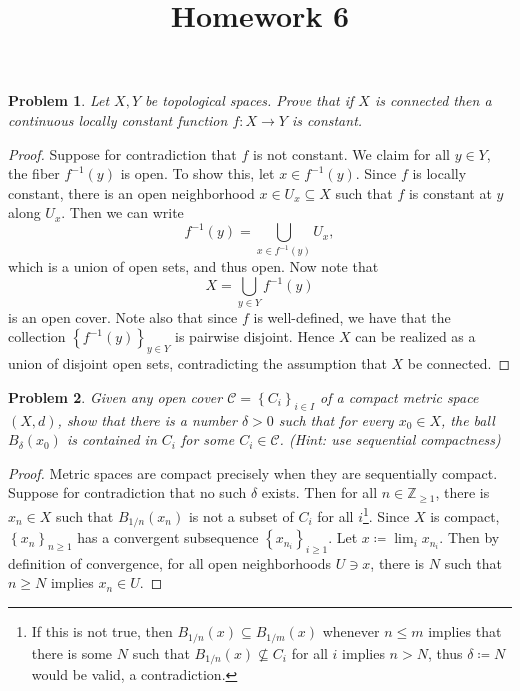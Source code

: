 \documentclass[11pt, letterpaper]{article}
\title{Homework 6}
\theoremstyle{plain}
\newtheorem{problem}{Problem}
\begin{document}
\makeproblem
\begin{problem}
	Let $X,Y$ be topological spaces. Prove that if $X$ is connected then a continuous locally constant function $f : X \to Y$ is constant.
\end{problem}
\begin{proof}
	Suppose for contradiction that $f$ is not constant. We claim for all $y\in Y$, the fiber $f^{-1} (y)$ is open. To show this, let $x\in f^{-1} (y)$. Since $f$ is locally constant, there is an open neighborhood $x\in U_x\subseteq X$ such that $f$ is constant at $y$ along $U_x$. Then we can write
	\[
		f^{-1} (y) = \bigcup_{x\in f^{-1} (y)} U_x,
	\]
	which is a union of open sets, and thus open. Now note that
	\[
		X=\bigcup_{y\in Y} f^{-1} (y)
	\]
	is an open cover. Note also that since $f$ is well-defined, we have that the collection $\left\{ f^{-1} (y) \right\} _{y\in Y} $ is pairwise disjoint. Hence $X$ can be realized as a union of disjoint open sets, contradicting the assumption that $X$ be connected.
\end{proof}
\begin{problem}
	Given any open cover $\mathcal{C} =\left\{ C_i \right\} _{i\in I} $ of a compact metric space $(X,d)$, show that there is a number $\delta >0$ such that for every $x_0\in X$, the ball $B_\delta (x_0)$ is contained in $C_i$ for some $C_i\in \mathcal{C} $. (Hint: use sequential compactness)
\end{problem}
\begin{proof}
	Metric spaces are compact precisely when they are sequentially compact. Suppose for contradiction that no such $\delta $ exists. Then for all $n\in\mathbb{Z} _{\geq 1} $, there is $x_n\in X$ such that $B_{1/n} (x_n)$ is not a subset of $C_i$ for all $i$\footnote{If this is not true, then $B_{1/n} (x)\subseteq B_{1/m} (x)$ whenever $n\leq m$ implies that there is some $N$ such that $B_{1/n} (x)\nsubseteq C_i$ for all $i$ implies $n>N$, thus $\delta \coloneqq N$ would be valid, a contradiction.}. Since $X$ is compact, $\left\{ x_n \right\} _{n\geq 1} $ has a convergent subsequence $\left\{ x_{n_i}  \right\} _{i\geq 1} $. Let $x\coloneqq \lim_ix_{n_i} $. Then by definition of convergence, for all open neighborhoods $U\ni x$, there is $N$ such that $n\geq N$ implies $x_n\in U$. 
\end{proof}
\end{document}

